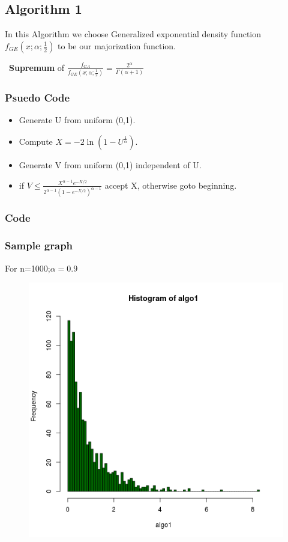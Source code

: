 \documentclass[11pt]{article}
\begin{document}
\subsection{Algorithm 1}
In this Algorithm we choose Generalized exponential density function $f_{GE}(x;\alpha;\frac{1}{2})$ to be our majorization function.\\
\begin{center}
\ \textbf{Supremum} of $\frac{f_{GA}}{f_{GE}(x;\alpha;\frac{1}{2})}=\frac{2^{\alpha}}{\Gamma(\alpha+1)}$
\end{center}
\subsubsection{Psuedo Code}
\begin{itemize}
\item Generate U from uniform (0,1).
\item Compute $X = -2\ln\left(1-U^{\frac{1}{\alpha}}\right).$
\item Generate V from uniform (0,1) independent of U.
\item if $V \leq \frac{X^{\alpha-1}e^{-X/2}}{2^{\alpha-1}\left(1-e^{-X/2}\right)^{\alpha-1}}$ accept X, otherwise goto beginning.
\end{itemize}
\subsubsection{Code}

\subsubsection{Sample graph}
For n=1000;$\alpha=0.9$
\begin{figure}[H]
\centering
\includegraphics[scale=.65]{image3}
\end{figure}
\end{document}
